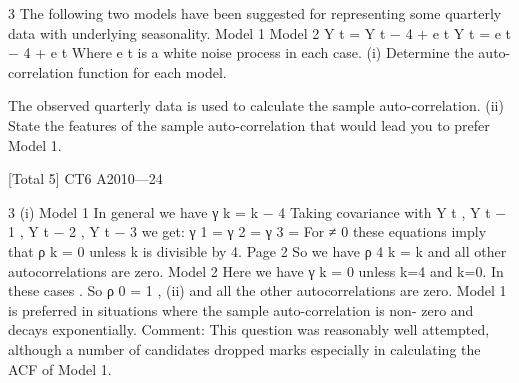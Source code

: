 \documentclass[a4paper,12pt]{article}
\begin{document}
 

3
The following two models have been suggested for representing some quarterly data
with underlying seasonality.
Model 1
Model 2
Y t = \alpha Y t − 4 + e t
Y t = \beta e t − 4 + e t
Where e t is a white noise process in each case.
(i)
Determine the auto-correlation function for each model.

The observed quarterly data is used to calculate the sample auto-correlation.
(ii)
State the features of the sample auto-correlation that would lead you to prefer
Model 1.

[Total 5]
CT6 A2010—24

3
(i)
Model 1
In general we have γ k =  k − 4
Taking covariance with Y t , Y t − 1 , Y t − 2 , Y t − 3 we get:
γ 1 = 
γ 2 = 
γ 3 = 
For \alpha ≠ 0 these equations imply that ρ k = 0 unless k is divisible by 4.
Page 2%
So we have ρ 4 k = \alpha k and all other autocorrelations are zero.
Model 2
Here we have γ k = 0 unless k=4 and k=0. In these cases
.
So ρ 0 = 1 ,
(ii)
and all the other autocorrelations are zero.
Model 1 is preferred in situations where the sample auto-correlation is non-
zero and decays exponentially.
Comment: This question was reasonably well attempted, although a number of candidates
dropped marks especially in calculating the ACF of Model 1.
\end{document}
